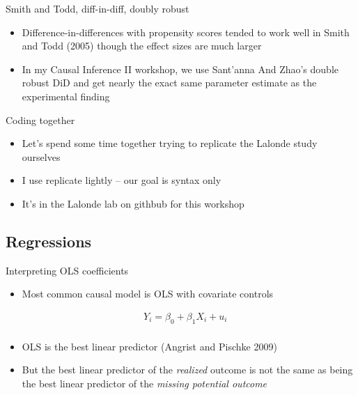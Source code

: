 \documentclass{beamer}
\begin{document}
\begin{frame}{Smith and Todd, diff-in-diff, doubly robust}

\begin{itemize}
\item Difference-in-differences with propensity scores tended to work well in Smith and Todd (2005) though the effect sizes are much larger
\item In my Causal Inference II workshop, we use Sant'anna And Zhao's double robust DiD and get nearly the exact same parameter estimate as the experimental finding

\end{itemize}

\end{frame}

\begin{frame}{Coding together}

\begin{itemize}

\item Let's spend some time together trying to replicate the Lalonde study ourselves
\item I use replicate lightly -- our goal is syntax only
\item It's in the Lalonde lab on githbub for this workshop

\end{itemize}

\end{frame}


\subsection{Regressions}



\begin{frame}{Interpreting OLS coefficients}

\begin{itemize}
\item Most common causal model is OLS with covariate controls 


		\begin{align*}
		Y_i = \beta_0 + \beta_1 X_i + u_i&\\
		\end{align*}

\item OLS is the best linear predictor (Angrist and Pischke 2009)
\item But the best linear predictor of the \emph{realized} outcome is not the same as being the best linear predictor of the \emph{missing potential outcome}

\end{itemize}

\end{frame}
\end{document}
